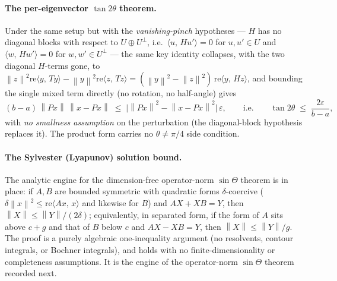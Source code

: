 \documentclass[11pt]{article}
\newcommand{\norm}[1]{\left\lVert #1\right\rVert}
\newcommand{\eps}{\varepsilon}
\newcommand{\inner}[2]{\langle #1,\,#2\rangle}
\newcommand{\gap}{g}
\theoremstyle{remark}
\begin{document}
\paragraph{The per-eigenvector $\tan2\theta$ theorem.}
Under the same setup but with the \emph{vanishing-pinch} hypotheses --- $H$ has
no diagonal blocks with respect to $U\oplus U^{\perp}$, i.e.\
$\inner{u}{Hu'}=0$ for $u,u'\in U$ and $\inner{w}{Hw'}=0$ for $w,w'\in
U^{\perp}$ --- the same key identity collapses, with the two diagonal
$H$-terms gone, to
$\norm{z}^2\mathrm{re}\inner{y}{Ty}-\norm{y}^2\mathrm{re}\inner{z}{Tz}
=(\norm{y}^2-\norm{z}^2)\,\mathrm{re}\inner{y}{Hz}$, and bounding the single
mixed term directly (no rotation, no half-angle) gives
\[
  (b-a)\,\norm{Px}\,\norm{x-Px}\;\le\;\bigl|\norm{Px}^2-\norm{x-Px}^2\bigr|\,\eps,
  \qquad\text{i.e.}\qquad
  \tan2\theta\;\le\;\frac{2\eps}{b-a},
\]
with \emph{no smallness assumption} on the perturbation (the diagonal-block
hypothesis replaces it).  The product form carries no $\theta\ne\pi/4$ side
condition.

\paragraph{The Sylvester (Lyapunov) solution bound.}
The analytic engine for the dimension-free operator-norm $\sin\Theta$ theorem
is in place: if $A,B$ are bounded symmetric with quadratic forms
$\delta$-coercive ($\delta\norm{x}^2\le\mathrm{re}\inner{Ax}{x}$ and likewise
for $B$) and $AX+XB=Y$, then $\norm{X}\le\norm{Y}/(2\delta)$; equivalently, in
separated form, if the form of $A$ sits above $c+\gap$ and that of $B$ below
$c$ and $AX-XB=Y$, then $\norm{X}\le\norm{Y}/\gap$.  The proof is a purely
algebraic one-inequality argument (no resolvents, contour integrals, or
Bochner integrals), and holds with no finite-dimensionality or completeness
assumptions.  It is the engine of the operator-norm $\sin\Theta$ theorem
recorded next.
\end{document}
